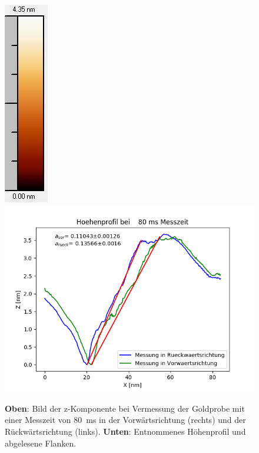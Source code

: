 \documentclass[12pt,a4paper]{article}
\begin{document}
\begin{figure}
\includegraphics[scale=0.6]{Bilder/Anhang/Zeit/0_08_Zeit_nach_Skala.jpg}
\includegraphics[scale=0.6]{Bilder/Anhang/Zeit/Profil_Zeit_80.png}
\caption{\textbf{Oben}: Bild der z-Komponente bei Vermessung der Goldprobe mit einer Messzeit von \SI{80}{ms} in der Vorwärtsrichtung (rechts) und der Rückwärtsrichtung (links). \textbf{Unten}: Entnommenes Höhenprofil und abgelesene Flanken.}
\end{figure}
\end{document}
